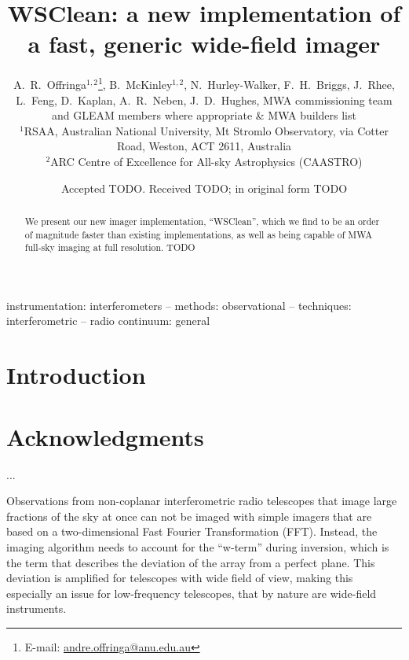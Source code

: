 \documentclass[useAMS,usenatbib]{mn2e}
\title[WSClean: a new imager]{WSClean: a new implementation of a fast, generic wide-field imager}
\author[A.~R.~Offringa et al.]{A.~R.~Offringa$^{1,2}$\thanks{E-mail:
\url{andre.offringa@anu.edu.au}}, B.~McKinley$^{1,2}$, N.~Hurley-Walker, 
F.~H.~Briggs, \newauthor
J.~Rhee, L.~Feng, D.~Kaplan, A.~R.~Neben, J.~D.~Hughes, MWA commissioning team\newauthor
and GLEAM members where appropriate \& MWA builders list
\\
$^{1}$RSAA, Australian National University, Mt Stromlo Observatory, via Cotter Road, Weston, ACT 2611, Australia \\
$^{2}$ARC Centre of Excellence for All-sky Astrophysics (CAASTRO) \\
}
\DeclareRobustCommand{\TUSSEN}[3]{#2}
\begin{document}
\date{Accepted TODO. Received TODO; in original form TODO}
\pagerange{\pageref{firstpage}--\pageref{lastpage}}

\label{firstpage}
\maketitle

\begin{abstract}
We present our new imager implementation, ``WSClean'', which we find to be an order of magnitude faster than existing implementations, as well as being capable of MWA full-sky imaging at full resolution.
TODO
\end{abstract}

\begin{keywords}
instrumentation: interferometers -- methods: observational -- techniques: interferometric -- radio continuum: general
\end{keywords}

\section{Introduction}

\section*{Acknowledgments}
...

\DeclareRobustCommand{\TUSSEN}[3]{#3}


Observations from non-coplanar interferometric radio telescopes that image large fractions of the sky at once can not be imaged with simple imagers that are based on a two-dimensional Fast Fourier Transformation (FFT). Instead, the imaging algorithm needs to account for the ``w-term'' during inversion, which is the term that describes the deviation of the array from a perfect plane. This deviation is amplified for telescopes with wide field of view, making this especially an issue for low-frequency telescopes, that by nature are wide-field instruments.
\end{document}
